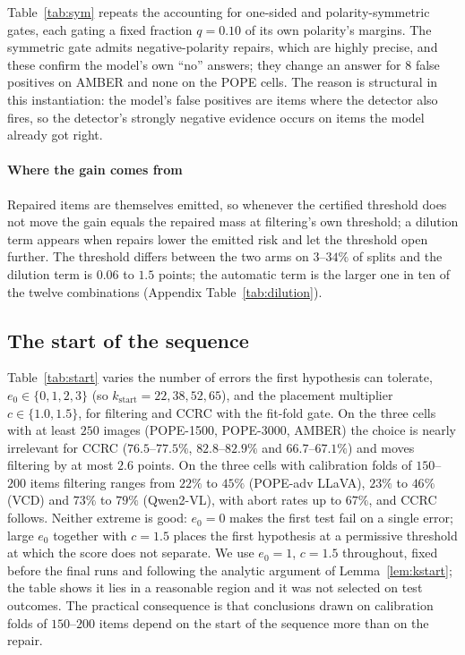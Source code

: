 Table~\ref{tab:sym} repeats the accounting for one-sided and polarity-symmetric gates, each gating a fixed
fraction $q=0.10$ of its own polarity's margins. The symmetric gate admits negative-polarity repairs, which are
highly precise, and these confirm the model's own ``no'' answers; they change an answer for $8$ false positives on AMBER and
none on the POPE cells. The reason is structural in this instantiation: the model's false positives are items where the detector
also fires, so the detector's strongly negative evidence occurs on items the model already got right.

\begin{table}[t]
\centering
\caption{Gate polarity at $\alpha=0.10$, $q=0.10$ per polarity. Gain over filtering in points, repaired items as a
percentage of test items, and the number of false-positive errors corrected (pooled over $400$ test folds).
Pooled margin is the gate used elsewhere in the paper.}
\label{tab:sym}
\small
\resizebox{\textwidth}{!}{}
\end{table}

\paragraph{Where the gain comes from}
Repaired items are themselves emitted, so whenever the certified threshold does not move the gain equals the repaired mass at filtering's own threshold; a dilution term appears when repairs lower the emitted risk and let the threshold open further. The threshold differs between the two arms on $3$--$34\%$ of splits and the dilution term is $0.06$ to $1.5$ points; the automatic term is the larger one in ten of the twelve combinations (Appendix Table~\ref{tab:dilution}).

\subsection{The start of the sequence}
\label{sec:start}

Table~\ref{tab:start} varies the number of errors the first hypothesis can tolerate, $e_0\in\{0,1,2,3\}$ (so
$k_{\mathrm{start}}=22,38,52,65$), and the placement multiplier $c\in\{1.0,1.5\}$, for filtering and CCRC with the
fit-fold gate. On the three cells with at least $250$ images (POPE-1500, POPE-3000, AMBER) the choice is nearly irrelevant for
CCRC ($76.5$--$77.5\%$, $82.8$--$82.9\%$ and $66.7$--$67.1\%$) and moves filtering by at most $2.6$ points. On the three cells with
calibration folds of $150$--$200$ items filtering ranges from $22\%$ to $45\%$ (POPE-adv LLaVA), $23\%$ to $46\%$ (VCD) and
$73\%$ to $79\%$ (Qwen2-VL), with abort rates up to $67\%$, and CCRC follows. Neither extreme is good: $e_0=0$ makes the first test fail on
a single error; large $e_0$ together with $c=1.5$ places the first hypothesis at a permissive threshold at which the score does not
separate. We use $e_0=1$, $c=1.5$ throughout, fixed before the final runs and following the analytic argument of Lemma~\ref{lem:kstart};
the table shows it lies in a reasonable region and it was not selected on test outcomes. The practical consequence is that conclusions drawn on
calibration folds of $150$--$200$ items depend on the start of the sequence more than on the repair.

